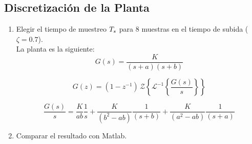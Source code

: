 \subsection{Discretización de la Planta}
\begin{enumerate}[label=2.\arabic*.]
	\item Elegir el tiempo de muestreo $T_s$ para 8 muestras en el tiempo de subida ($\zeta = 0.7$). \\
	La planta es la siguiente:
	\begin{equation}
		G(s) = \frac{K}{(s+a)(s+b)}
	\end{equation}
	
	\begin{equation}
		G(z)=(1 - z^{-1})\,\mathcal{Z}\left\{ \mathcal{L}^{-1}\left\{ \frac{G(s)}{s} \right\} \right\}
	\end{equation}
	
	\begin{equation}
		\frac{G(s)}{s} = \frac{K}{ab}\frac{1}{s}+\frac{K}{(b^2-ab)}\frac{1}{(s+b)}+\frac{K}{(a^2-ab)}\frac{1}{(s+a)}
	\end{equation}
	
	\item Comparar el resultado con Matlab.
\end{enumerate}
